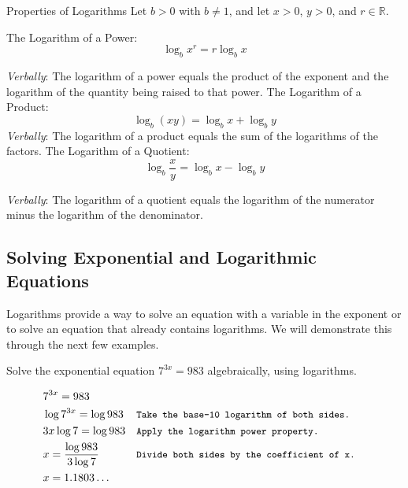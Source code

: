 \begin{custombox}{Properties of Logarithms}
\setlength{\leftskip}{1cm}  %
\setlength{\rightskip}{1cm} %
Let $b>0$ with $b\neq 1$, and let $x>0$, $y>0$, and $r\in\mathbb{R}$.

The Logarithm of a Power:
$$
\log _b x^r=r \log _b x
$$

\textit{Verbally}: The logarithm of a power equals the product of the exponent and the logarithm of the quantity being raised to that power.
\vspace{0.5cm}
The Logarithm of a Product:
$$
\log _b(x y)=\log _b x+\log _b y
$$
\textit{Verbally}: The logarithm of a product equals the sum of the logarithms of the factors.
\vspace{0.5cm}
The Logarithm of a Quotient:
$$
\log _b \frac{x}{y}=\log _b x-\log _b y
$$

\textit{Verbally}: The logarithm of a quotient equals the logarithm of the numerator minus the logarithm of the denominator.

\setlength{\leftskip}{0cm}  %
\setlength{\rightskip}{0cm} %

\end{custombox}

\subsection*{Solving Exponential and Logarithmic Equations}
Logarithms provide a way to solve an equation with a variable in the exponent or to solve an equation that already contains logarithms. We will demonstrate this through the next few examples.

\begin{example} Solve the exponential equation $7^{3 x}=983$ algebraically, using logarithms.

\begin{solution}
\begin{align*}
& 7^{3x} = 983  \\
& \log 7^{3x} = \log 983 && \texttt{\small Take the base-10 logarithm of both sides.} \\
& 3x \log 7 = \log 983 && \texttt{\small Apply the logarithm power property.} \\
& x = \frac{\log 983}{3 \log 7} && \texttt{\small Divide both sides by the coefficient of x.}\\
& x = 1.1803 \ldots   
\end{align*}


\end{solution}
    
\end{example}


